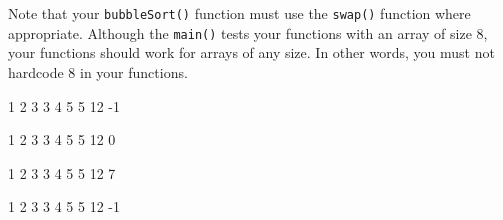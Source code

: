 Note that your \verb!bubbleSort()! function must use the \verb!swap()!
function where appropriate. Although the \verb!main()! tests your functions
with an array of size $8$, your functions should work for arrays of any size.
In other words, you must not hardcode $8$ in your functions.

\resett
\nextt
\begin{console}[frame=single, commandchars=\\\{\}]
1 2 3 3 4 5 5 12
-1
\end{console}

\nextt
\begin{console}[frame=single, commandchars=\\\{\}]
1 2 3 3 4 5 5 12
0
\end{console}

\nextt
\begin{console}[frame=single, commandchars=\\\{\}]
1 2 3 3 4 5 5 12
7
\end{console}

\nextt
\begin{console}[frame=single, commandchars=\\\{\}]
1 2 3 3 4 5 5 12
-1
\end{console}
